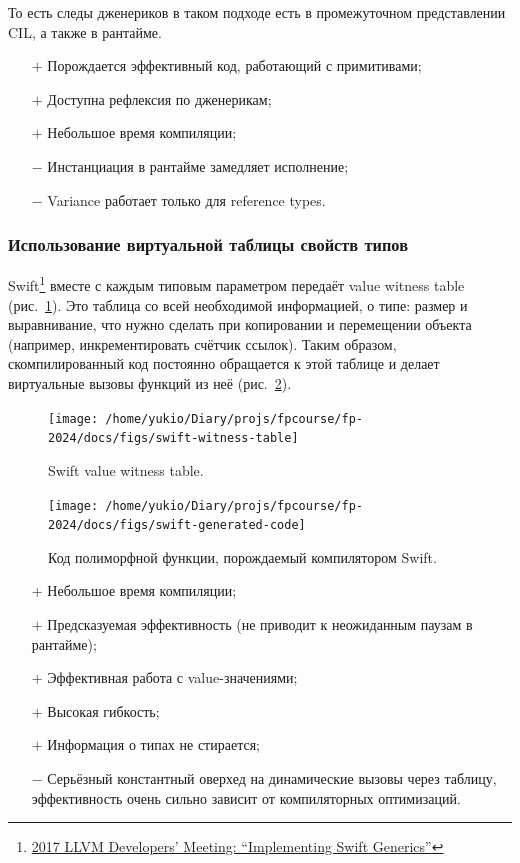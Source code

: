 \documentclass[12pt]{article}
\newcommand{\positive}{$+$} %
\newcommand{\negative}{{\color{red} $-$}} %
\begin{document}
    То есть следы дженериков в таком подходе есть в промежуточном представлении CIL, а также в рантайме.

    \begin{itemize}
        \item[\positive] Порождается эффективный код, работающий с примитивами;
        \item[\positive] Доступна рефлексия по дженерикам;
        \item[\positive] Небольшое время компиляции;
        \item[\negative] Инстанциация в рантайме замедляет исполнение;
        \item[\negative] Variance работает только для reference types.
    \end{itemize}


    \subsubsection{Использование виртуальной таблицы свойств типов} \label{subsubsec:swift-generics}

    Swift\footnote{\href{https://youtu.be/ctS8FzqcRug?si=y_ZYnuUOulA33d_X}{2017 LLVM Developers’ Meeting: ``Implementing Swift Generics''}} вместе с каждым типовым параметром передаёт value witness table (рис.~\ref{fig:swift-witness-table}).
    Это таблица со всей необходимой информацией, о типе: размер и выравнивание, что нужно сделать при копировании и перемещении объекта (например, инкрементировать счётчик ссылок).
    Таким образом, скомпилированный код постоянно обращается к этой таблице и делает виртуальные вызовы функций из неё (рис.~\ref{fig:swift-generated-code}).
    \begin{figure}
        \centering
        \texttt{[image: /home/yukio/Diary/projs/fpcourse/fp-2024/docs/figs/swift-witness-table]}
        \caption{Swift value witness table.}
        \label{fig:swift-witness-table}
    \end{figure}
    \begin{figure}
        \centering
        \texttt{[image: /home/yukio/Diary/projs/fpcourse/fp-2024/docs/figs/swift-generated-code]}
        \caption{Код полиморфной функции, порождаемый компилятором Swift.}
        \label{fig:swift-generated-code}
    \end{figure}

    \begin{itemize}
        \item[\positive] Небольшое время компиляции;
        \item[\positive] Предсказуемая эффективность (не приводит к неожиданным паузам в рантайме);
        \item[\positive] Эффективная работа с value-значениями;
        \item[\positive] Высокая гибкость;
        \item[\positive] Информация о типах не стирается;
        \item[\negative] Серьёзный константный оверхед на динамические вызовы через таблицу, эффективность очень сильно зависит от компиляторных оптимизаций.
    \end{itemize}
\end{document}
